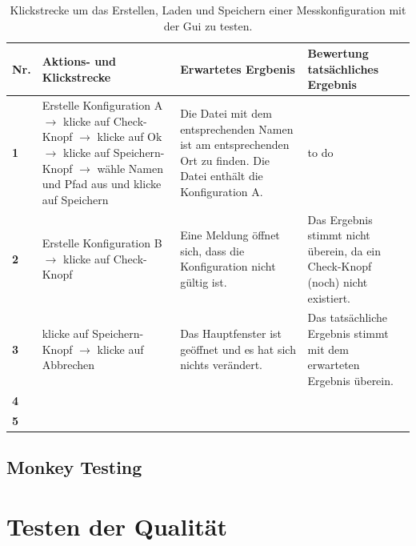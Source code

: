 \documentclass[parskip=full]{scrartcl}
\begin{document}
\begin{table}[h]
\begin{tabular}{| p{} | p{} | p{} | p{} |}
	\hline
	\textbf{Nr.} & \textbf{Aktions- und Klickstrecke} & \textbf{Erwartetes Ergbenis}  & \textbf{ Bewertung tatsächliches Ergebnis} \\ \hline
	\textbf{1}
	& 
	Erstelle Konfiguration A $\rightarrow$ klicke auf Check-Knopf $\rightarrow$ klicke auf Ok $\rightarrow$ klicke auf Speichern-Knopf $\rightarrow$ wähle Namen und Pfad aus und klicke auf Speichern 
	&
	Die Datei mit dem entsprechenden Namen ist am entsprechenden Ort zu finden. Die Datei enthält die Konfiguration A.
	& 
	to do
	\\ \hline
	
	\textbf{2}
	& 
	Erstelle Konfiguration B $\rightarrow$ klicke auf Check-Knopf
	&
	Eine Meldung öffnet sich, dass die Konfiguration nicht gültig ist.
	& 
	Das Ergebnis stimmt nicht überein, da ein Check-Knopf (noch) nicht existiert.
	\\ \hline
	
	\textbf{3}
	& 
	klicke auf Speichern-Knopf $\rightarrow$ klicke auf Abbrechen
	&
	Das Hauptfenster ist geöffnet und es hat sich nichts verändert.
	& 
	Das tatsächliche Ergebnis stimmt mit dem erwarteten Ergebnis überein.
	\\ \hline
	
	\textbf{4}
	& 
	
	&
	
	& 
	
	\\ \hline
	
	\textbf{5}
	& 
	
	&
	
	& 
	
	\\ \hline
	
		
	
	
\end{tabular}
\caption{Klickstrecke um das Erstellen, Laden und Speichern einer Messkonfiguration mit der Gui zu testen.}
\label{klickConfig}
\end{table}

\subsection{Monkey Testing}

\clearpage
\section{Testen der Qualität} \label{quali}
\end{document}
